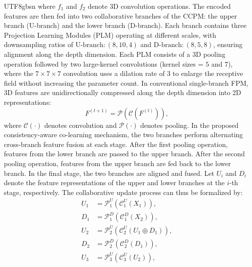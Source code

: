 \documentclass[times, review, 10pt]{elsarticle}
\begin{document}
\begin{CJK}{UTF8}{gbsn}
where $f_1$ and $f_2$ denote 3D convolution operations. The encoded features are then fed into two collaborative branches of the CCPM: the upper branch (U-branch) and the lower branch (D-branch). Each branch contains three Projection Learning Modules (PLM) operating at different scales, with downsampling ratios of $\mathrm{U\text{-}branch:(8, 10, 4)}$ and $\mathrm{D\text{-}branch:(8, 5, 8)}$, ensuring alignment along the depth dimension. Each PLM consists of a 3D pooling operation followed by two large-kernel convolutions (kernel sizes = $5$ and $7$), where the $7 \times 7 \times 7$ convolution uses a dilation rate of $3$ to enlarge the receptive field without increasing the parameter count. In conventional single-branch FPM, 3D features are unidirectionally compressed along the depth dimension into 2D representations:
\begin{equation}
F^{(t+1)}=\mathcal{P}(\mathcal{C}(F^{(t)})),
\end{equation}
where $\mathcal{C}(\cdot)$ denotes convolution and $\mathcal{P}(\cdot)$ denotes pooling. In the proposed consistency-aware co-learning mechanism, the two branches perform alternating cross-branch feature fusion at each stage. After the first pooling operation, features from the lower branch are passed to the upper branch. After the second pooling operation, features from the upper branch are fed back to the lower branch. In the final stage, the two branches are aligned and fused. Let $U_i$ and $D_i$ denote the feature representations of the upper and lower branches at the $i$-th stage, respectively. The collaborative update process can thus be formalized by:
\begin{equation}
\begin{split}
U_{1}&=\mathcal{P}_{1}^{U}\left(\mathcal{C}_{1}^{U}\left(X_{1}\right)\right), \\
D_{1}&=\mathcal{P}_{1}^{D}\left(\mathcal{C}_{1}^{D}\left(X_{2}\right)\right), \\
U_{2}&=\mathcal{P}_{2}^{U}\left(\mathcal{C}_{2}^{U}\left(U_{1} \oplus D_{1}\right)\right), \\
D_{2}&=\mathcal{P}_{2}^{D}\left(\mathcal{C}_{2}^{D}\left(D_{1} \right)\right), \\
U_{3}&=\mathcal{P}_{3}^{U}\left(\mathcal{C}_{3}^{U}\left(U_{2}\right)\right), \\

\end{split}
\end{equation}
\end{CJK}
\end{document}
